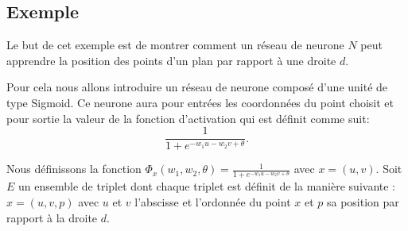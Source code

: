 \documentclass{article}
\begin{document}
\subsection{Exemple}

Le but de cet exemple est de montrer comment un réseau de neurone $N$ peut apprendre la position des points d'un plan par rapport à une droite $d$.

\vfill
\begin{center}
\end{center}
\vfill


Pour cela nous allons introduire un réseau de neurone composé d'une unité de type Sigmoid.
Ce neurone aura pour entrées les coordonnées du point choisit et pour sortie la valeur de la fonction d'activation qui est définit comme suit: 
\[ \frac{1}{1+e^{-w_{1}u-w_{2}v+\theta}}. \]

\vfill
\begin{center}
\end{center}
\vfill

Nous définissons la fonction $\Phi_{x}(w_{1},w_{2},\theta)= \frac{1}{1+e^{-w_{1}u-w_{2}v+\theta}}$ avec $x=(u,v)$.
Soit $E$ un ensemble de triplet dont chaque triplet est définit de la manière suivante : 
$x = (u,v,p)$ 	avec $u$ et $v$ l'abscisse et l'ordonnée du point $x$ et $p$ sa position par rapport à la droite $d$.
\end{document}
